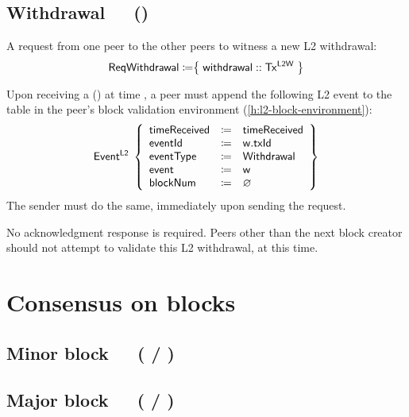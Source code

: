 \documentclass[../hydrozoa.tex]{subfiles}
\begin{document}
\subsection{Withdrawal~~~()}%
\label{h:l2-consensus-withdrawal}%

A request from one peer to the other peers to witness a new L2 withdrawal:
\begin{equation*}
  \mathsf{ReqWithdrawal} \coloneq \bigr\{\; \mathsf{withdrawal} :: \mathsf{Tx^{L2W}} \;\bigr\}
\end{equation*}

Upon receiving a () at time , a peer must append the following L2 event to the  table in the peer's block validation environment (\cref{h:l2-block-environment}):
\begin{equation*}
  \mathsf{Event^{L2}}\;\left\{
  \begin{array}{lll}
    \mathsf{timeReceived} &\coloneq& \mathsf{timeReceived} \\
    \mathsf{eventId} &\coloneq& \mathsf{w.txId} \\
    \mathsf{eventType} &\coloneq& \mathsf{Withdrawal} \\
    \mathsf{event} &\coloneq& \mathsf{w} \\
    \mathsf{blockNum} &\coloneq& \varnothing
  \end{array}\right\}
\end{equation*}
The sender must do the same, immediately upon sending the request.

No acknowledgment response is required.
Peers other than the next block creator should not attempt to validate this L2 withdrawal, at this time.

\section{Consensus on blocks}%
\label{h:l2-consensus-on-blocks}%

\subsection{Minor block~~~( / )}%
\label{h:l2-consensus-minor-block}%



\subsection{Major block~~~( / )}%
\label{h:l2-consensus-major-block}%
\end{document}
